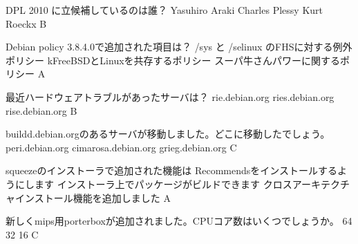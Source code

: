 %

\santaku
{DPL 2010 に立候補しているのは誰？}
{Yasuhiro Araki} %
{Charles Plessy}
{Kurt Roeckx}
{B}
{}

\santaku
{Debian policy 3.8.4.0で追加された項目は？}
{/sys と /selinux のFHSに対する例外ポリシー}
{kFreeBSDとLinuxを共存するポリシー}
{スーパ牛さんパワーに関するポリシー}
{A}
{}

\santaku
{最近ハードウェアトラブルがあったサーバは？}
{rie.debian.org}
{ries.debian.org} %
{rise.debian.org }
{B}
{}

\santaku
{buildd.debian.orgのあるサーバが移動しました。どこに移動したでしょう。}
{peri.debian.org} %
{cimarosa.debian.org} %
{grieg.debian.org} %
{C}
{}

\santaku
{squeezeのインストーラで追加された機能は}
{Recommendsをインストールするようにします}
{インストーラ上でパッケージがビルドできます}
{クロスアーキテクチャインストール機能を追加しました}
{A}
{}

\santaku
{新しくmips用porterboxが追加されました。CPUコア数はいくつでしょうか。}
{64}
{32}
{16}
{C}
{}
